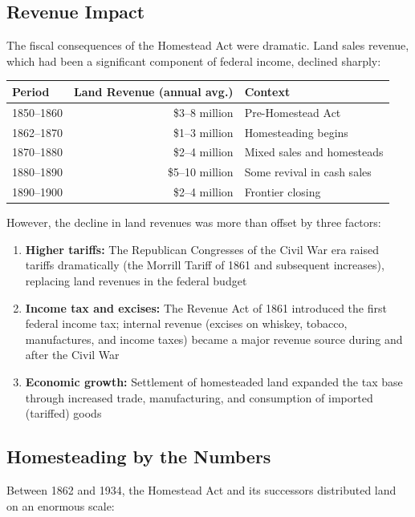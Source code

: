 \documentclass[12pt]{article}
\begin{document}
\subsection{Revenue Impact}

The fiscal consequences of the Homestead Act were dramatic.  Land sales revenue, which had been a significant component of federal income, declined sharply:

\begin{center}
\begin{tabular}{lrl}
\toprule
Period & Land Revenue (annual avg.) & Context \\
\midrule
1850--1860 & \$3--8 million & Pre-Homestead Act \\
1862--1870 & \$1--3 million & Homesteading begins \\
1870--1880 & \$2--4 million & Mixed sales and homesteads \\
1880--1890 & \$5--10 million & Some revival in cash sales \\
1890--1900 & \$2--4 million & Frontier closing \\
\bottomrule
\end{tabular}
\end{center}

However, the decline in land revenues was more than offset by three factors:

\begin{enumerate}
\item \textbf{Higher tariffs:} The Republican Congresses of the Civil War era raised tariffs dramatically (the Morrill Tariff of 1861 and subsequent increases), replacing land revenues in the federal budget
\item \textbf{Income tax and excises:} The Revenue Act of 1861 introduced the first federal income tax; internal revenue (excises on whiskey, tobacco, manufactures, and income taxes) became a major revenue source during and after the Civil War
\item \textbf{Economic growth:} Settlement of homesteaded land expanded the tax base through increased trade, manufacturing, and consumption of imported (tariffed) goods
\end{enumerate}

\subsection{Homesteading by the Numbers}

Between 1862 and 1934, the Homestead Act and its successors distributed land on an enormous scale:
\end{document}
